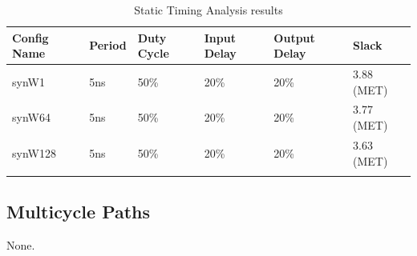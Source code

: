\renewcommand*{\arraystretch}{1.4}
\begin{longtable}[H]{
    | p{}
    | p{}
    | p{}
    | p{}
    | p{}
    | p{} |
  }
  \hline
  \textbf{Config Name}  &
  \textbf{Period}       &
  \textbf{Duty Cycle}   &
  \textbf{Input Delay}  &
  \textbf{Output Delay} &
  \textbf{Slack}          \\ \hline \hline

  synW1                 &
  5ns                   &
  50\%                  &
  20\%                  &
  20\%                  &
  3.88 (MET)              \\ \hline

  synW64                &
  5ns                   &
  50\%                  &
  20\%                  &
  20\%                  &
  3.77 (MET)              \\ \hline

  synW128               &
  5ns                   &
  50\%                  &
  20\%                  &
  20\%                  &
  3.63 (MET)              \\ \hline

  \caption{Static Timing Analysis results}\label{table:timing}
\end{longtable}

\subsection{Multicycle Paths}
None.
